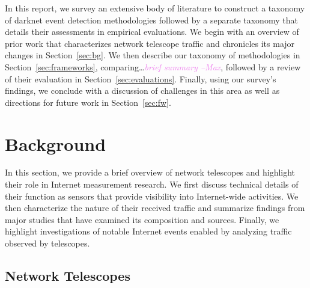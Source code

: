 \documentclass[manuscript,nonacm]{acmart}
\newcommand{\maxnote}[1]{\textit{\textcolor{violet}{#1 --Max}}}
\begin{document}


In this report, we survey an extensive body of literature to construct a taxonomy of darknet event detection methodologies followed by a separate taxonomy that details their assessments in empirical evaluations. 
We begin with an overview of prior work that characterizes network telescope traffic and chronicles its major changes in Section~\ref{sec:bg}.
We then describe our taxonomy of methodologies in Section~\ref{sec:frameworks}, comparing\dots\maxnote{brief summary}, followed by a review of their evaluation in Section~\ref{sec:evaluations}.
Finally, using our survey's findings, we conclude with a discussion of challenges in this area as well as directions for future work in Section~\ref{sec:fw}.


\label{sec:bg}
\section{Background}
In this section, we provide a brief overview of network telescopes and highlight their role in Internet measurement research.
We first discuss technical details of their function as sensors that provide visibility into Internet-wide activities. 
We then characterize the nature of their received traffic and summarize findings from major studies that have examined its composition and sources.
Finally, we highlight investigations of notable Internet events enabled by analyzing traffic observed by telescopes.

\label{sec:bg:nt}
\subsection{Network Telescopes}
\end{document}
